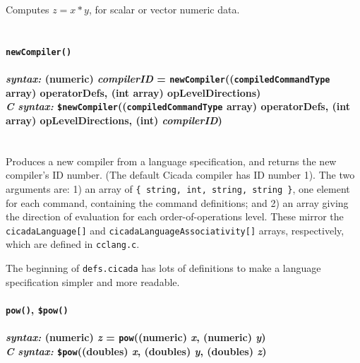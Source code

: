 \documentclass{article}
\begin{document}
Computes $z = x * y$, for scalar or vector numeric data.\\\\




\paragraph{\texttt{newCompiler()}\\\\
\normalfont \emph{syntax: } (numeric) \emph{compilerID} = \texttt{newCompiler}((\texttt{compiledCommandType} array) operatorDefs, (int array) opLevelDirections)\\
\normalfont \emph{C syntax: } \texttt{\$newCompiler}((\texttt{compiledCommandType} array) operatorDefs, (int array) opLevelDirections, (int) \emph{compilerID})\\\\}

Produces a new compiler from a language specification, and returns the new compiler's ID number.  (The default Cicada compiler has ID number 1).  The two arguments are:  1) an array of \texttt{\{ string, int, string, string \}}, one element for each command, containing the command definitions; and 2) an array giving the direction of evaluation for each order-of-operations level.  These mirror the \verb#cicadaLanguage[]# and \verb#cicadaLanguageAssociativity[]# arrays, respectively, which are defined in \verb#cclang.c#.

The beginning of \verb#defs.cicada# has lots of definitions to make a language specification simpler and more readable.\\





\paragraph{\texttt{pow()}, \texttt{\$pow()}\\\\
\normalfont \emph{syntax: } (numeric) \emph{z} = \texttt{pow}((numeric) \emph{x}, (numeric) \emph{y})\\
\normalfont \emph{C syntax: } \texttt{\$pow}((doubles) \emph{x}, (doubles) \emph{y}, (doubles) \emph{z})\\\\}
\end{document}
